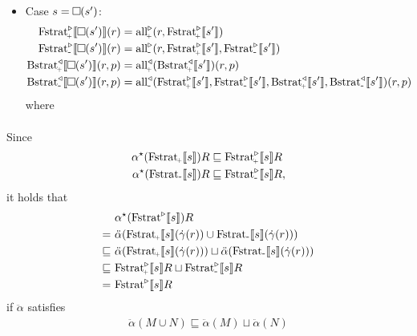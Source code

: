 \documentclass{article}
\newcommand{\minus}{{\scalebox{0.9}{-}}}
\newcommand{\plus}{{\scalebox{0.6}{\!+}}}
\renewcommand{\square}{\mathbin{\text{\tikz [x=1ex,y=1ex,scale=1.5,line width=.1ex,line join=round] \draw (0,0) rectangle (1,1);}}}
\newcommand{\all}[1]{\ensuremath \square(#1)}
\newcommand{\Fstratm}[1]{\ensuremath \text{Fstrat}_\minus \llbracket #1 \rrbracket}
\newcommand{\Fstratp}[1]{\ensuremath \text{Fstrat}_\plus \llbracket #1 \rrbracket}
\newcommand{\Fstrata}[1]{\ensuremath \text{Fstrat}^\triangleright \llbracket #1 \rrbracket}
\newcommand{\Fstratam}[1]{\ensuremath \text{Fstrat}^\triangleright_\minus \llbracket #1 \rrbracket}
\newcommand{\Fstratap}[1]{\ensuremath \text{Fstrat}^\triangleright_\plus \llbracket #1 \rrbracket}
\newcommand{\Bstratap}[1]{\ensuremath \text{Bstrat}_\plus^\triangleleft \llbracket #1 \rrbracket}
\newcommand{\Bstratam}[1]{\ensuremath \text{Bstrat}_\minus^\triangleleft \llbracket #1 \rrbracket}
\newcommand{\Statea}{\ensuremath \widehat{\text{State}}}
\newcommand{\Statefail}{\ensuremath L_F}
\newcommand{\fallap}{\ensuremath \text{all}^\triangleright_\plus}
\newcommand{\fallam}{\ensuremath \text{all}^\triangleright_\minus}
\newcommand{\ballap}{\ensuremath \text{all}^\triangleleft_\plus}
\newcommand{\ballam}{\ensuremath \text{all}^\triangleleft_\minus}
\begin{document}
\begin{itemize}
\item Case $s = \all{s'}$:
  \begin{align*}
    \Fstratap{\all{s'}}(r) &= \fallap(r,\Fstratap{s'}) \\
    \Fstratam{\all{s'}}(r) &= \fallam(r,\Fstratap{s'},\Fstratam{s'}) \\
    \Bstratap{\all{s'}}(r,p) &= \ballap(\Bstratap{s'})(r,p) \\
    \Bstratam{\all{s'}}(r,p) &= \ballam(\Fstratap{s'},\Fstratam{s'},
                                         \Bstratap{s'},\Bstratam{s'})(r,p)
  \end{align*}
  where
  \begin{align*}
  \end{align*}
  

\end{itemize}

Since
\begin{align*}
  \alpha^\star(\Fstratp{s})R &\sqsubseteq \Fstratap{s}R \\
  \alpha^\star(\Fstratm{s})R &\sqsubseteq \Fstratam{s}R,
\end{align*}
it holds that
\begin{align*}
   &\ \alpha^\star(\Fstrata{s})R \\
  =&\ \ddot{\alpha}(\Fstratp{s}(\dot{\gamma}(r)) \cup \Fstratm{s}(\dot{\gamma}(r))) \\
  \sqsubseteq&\ \ddot{\alpha}(\Fstratp{s}(\dot{\gamma}(r))) \sqcup \ddot{\alpha}(\Fstratm{s}(\dot{\gamma}(r))) \\
  \sqsubseteq&\ \Fstratap{s}R \sqcup \Fstratam{s}R \\
  =&\ \Fstrata{s}R
\end{align*}
if $\ddot{\alpha}$ satisfies
\begin{align*}
  \ddot{\alpha}(M \cup N) \sqsubseteq \ddot{\alpha}(M) \sqcup \ddot{\alpha}(N)
\end{align*}
\end{document}
